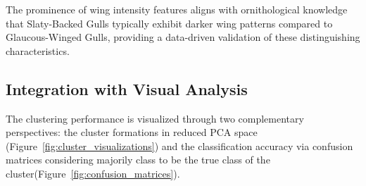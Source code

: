 \documentclass[a4paper,12pt]{report}
\begin{document}
The prominence of wing intensity features aligns with ornithological knowledge that Slaty-Backed Gulls typically exhibit darker wing patterns compared to Glaucous-Winged Gulls, providing a data-driven validation of these distinguishing characteristics.

\subsection{Integration with Visual Analysis}

The clustering performance is visualized through two complementary perspectives: the cluster formations in reduced PCA space (Figure~\ref{fig:cluster_visualizations}) and the classification accuracy via confusion matrices considering majorily class to be the true class of the cluster(Figure~\ref{fig:confusion_matrices}).
\end{document}
